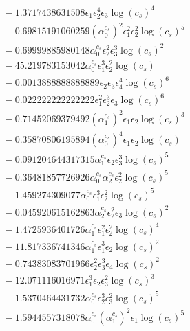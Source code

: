 \documentclass[10pt]{article}
\begin{document}
\begin{align*}
&{}  - 1.3717438631508 \epsilon_{1} \epsilon_{2}^{4} \epsilon_{3} \log{\left(c_{s} \right)}^{4} \\
&{}  - 0.69815191060259 \left(\alpha_{0}^{c_s}\right)^{2} \epsilon_{1}^{2} \epsilon_{2}^{2} \log{\left(c_{s} \right)}^{5} \\
&{}  - 0.69999885980148 \alpha_{0}^{c_s} \epsilon_{2}^{2} \epsilon_{3}^{3} \log{\left(c_{s} \right)}^{2} \\
&{}  - 45.219783153042 \alpha_{0}^{c_s} \epsilon_{1}^{3} \epsilon_{2}^{2} \log{\left(c_{s} \right)} \\
&{}  - 0.0013888888888889 \epsilon_{2} \epsilon_{3} \epsilon_{4}^{4} \log{\left(c_{s} \right)}^{6} \\
&{}  - 0.022222222222222 \epsilon_{1}^{2} \epsilon_{2}^{3} \epsilon_{3} \log{\left(c_{s} \right)}^{6} \\
&{}  - 0.71452069379492 \left(\alpha_{1}^{c_s}\right)^{2} \epsilon_{1} \epsilon_{2} \log{\left(c_{s} \right)}^{3} \\
&{}  - 0.35870806195894 \left(\alpha_{0}^{c_s}\right)^{4} \epsilon_{1} \epsilon_{2} \log{\left(c_{s} \right)} \\
&{}  - 0.091204644317315 \alpha_{1}^{c_s} \epsilon_{2} \epsilon_{3}^{3} \log{\left(c_{s} \right)}^{5} \\
&{}  - 0.36481857726926 \alpha_{0}^{c_s} \alpha_{2}^{c_s} \epsilon_{2}^{2} \log{\left(c_{s} \right)}^{5} \\
&{}  - 1.459274309077 \alpha_{0}^{c_s} \epsilon_{1}^{3} \epsilon_{2}^{2} \log{\left(c_{s} \right)}^{5} \\
&{}  - 0.045920615162863 \alpha_{2}^{c_s} \epsilon_{2}^{2} \epsilon_{3} \log{\left(c_{s} \right)}^{2} \\
&{}  - 1.4725936401726 \alpha_{1}^{c_s} \epsilon_{1}^{2} \epsilon_{2}^{2} \log{\left(c_{s} \right)}^{4} \\
&{}  - 11.817336741346 \alpha_{1}^{c_s} \epsilon_{1}^{3} \epsilon_{2} \log{\left(c_{s} \right)}^{2} \\
&{}  - 0.74383083701966 \epsilon_{2}^{2} \epsilon_{3}^{3} \epsilon_{4} \log{\left(c_{s} \right)}^{2} \\
&{}  - 12.071116016971 \epsilon_{1}^{3} \epsilon_{2} \epsilon_{3}^{2} \log{\left(c_{s} \right)}^{3} \\
&{}  - 1.5370464431732 \alpha_{0}^{c_s} \epsilon_{2}^{3} \epsilon_{3}^{2} \log{\left(c_{s} \right)}^{5} \\
&{}  - 1.5944557318078 \alpha_{0}^{c_s} \left(\alpha_{1}^{c_s}\right)^{2} \epsilon_{1} \log{\left(c_{s} \right)}^{5} \\

\end{align*}
\end{document}

